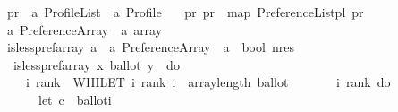 \begin{isabellebody}
\ pr{}{\isacharunderscore}{\kern0pt}{\isasymalpha}\ {\isacharcolon}{\kern0pt}{\isacharcolon}{\kern0pt}\ {\isachardoublequoteopen}{\isacharprime}{\kern0pt}a\ Profile{\isacharunderscore}{\kern0pt}List\ {\isasymRightarrow}\ {\isacharprime}{\kern0pt}a\ Profile{\isachardoublequoteclose}\ \isanewline
\ \ {\isachardoublequoteopen}pr{}{\isacharunderscore}{\kern0pt}{\isasymalpha}\ pr{}\ {\isacharequal}{\kern0pt}\ map\ {\isacharparenleft}{\kern0pt}Preference{\isacharunderscore}{\kern0pt}List{\isachardot}{\kern0pt}pl{\isacharunderscore}{\kern0pt}{\isasymalpha}{\isacharparenright}{\kern0pt}\ pr{}{\isachardoublequoteclose}\isanewline
\isanewline
{}\isamarkupfalse%
\ {\isacharprime}{\kern0pt}a\ Preference{\isacharunderscore}{\kern0pt}Array\ {\isacharequal}{\kern0pt}\ {\isachardoublequoteopen}{\isacharprime}{\kern0pt}a\ array{\isachardoublequoteclose}\isanewline
\isanewline
\isanewline
{}\isamarkupfalse%
\ is{\isacharunderscore}{\kern0pt}less{\isacharunderscore}{\kern0pt}pref{\isacharunderscore}{\kern0pt}array\ {\isacharcolon}{\kern0pt}{\isacharcolon}{\kern0pt}{\isachardoublequoteopen}{\isacharprime}{\kern0pt}a\ {\isasymRightarrow}\ {\isacharprime}{\kern0pt}a\ Preference{\isacharunderscore}{\kern0pt}Array\ {\isasymRightarrow}\ {\isacharprime}{\kern0pt}a\ {\isasymRightarrow}\ bool\ nres{\isachardoublequoteclose}\ \isanewline
\ \ {\isachardoublequoteopen}is{\isacharunderscore}{\kern0pt}less{\isacharunderscore}{\kern0pt}pref{\isacharunderscore}{\kern0pt}array\ x\ ballot\ y\ {\isasymequiv}\ do\ {\isacharbraceleft}{\kern0pt}\isanewline
\ \ \ \ {\isacharparenleft}{\kern0pt}i{\isacharcomma}{\kern0pt}\ rank{\isacharparenright}{\kern0pt}\ {\isasymleftarrow}\ WHILET\ {\isacharparenleft}{\kern0pt}{\isasymlambda}{\isacharparenleft}{\kern0pt}i{\isacharcomma}{\kern0pt}\ rank{\isacharparenright}{\kern0pt}{\isachardot}{\kern0pt}\ {\isacharparenleft}{\kern0pt}i\ {\isacharless}{\kern0pt}\ {\isacharparenleft}{\kern0pt}array{\isacharunderscore}{\kern0pt}length\ ballot{\isacharparenright}{\kern0pt}{\isacharparenright}{\kern0pt}{\isacharparenright}{\kern0pt}\ \isanewline
\ \ \ \ \ \ {\isacharparenleft}{\kern0pt}{\isasymlambda}{\isacharparenleft}{\kern0pt}i{\isacharcomma}{\kern0pt}\ rank{\isacharparenright}{\kern0pt}{\isachardot}{\kern0pt}\ do\ {\isacharbraceleft}{\kern0pt}\isanewline
\ \ \ \ \ \ let\ c\ {\isacharequal}{\kern0pt}\ ballot{\isacharbrackleft}{\kern0pt}{\isacharbrackleft}{\kern0pt}i{\isacharbrackright}{\kern0pt}{\isacharbrackright}{\kern0pt}{\isacharsemicolon}{\kern0pt}\isanewline

\end{isabellebody}
